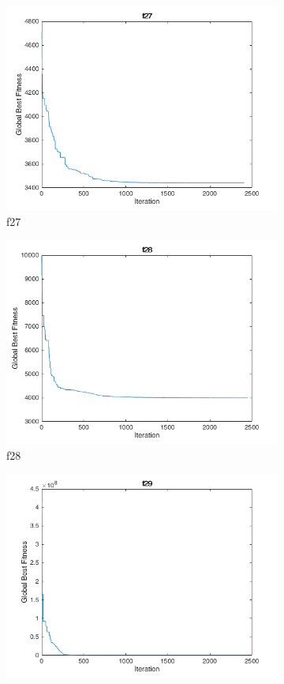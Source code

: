 \begin{figure}
\begin{subfigure}[b]{0.4\textwidth}
    \includegraphics[width=\textwidth]{img/cecrt/f27}
    \caption{f27}
  \end{subfigure}
  \begin{subfigure}[b]{0.4\textwidth}
    \includegraphics[width=\textwidth]{img/cecrt/f28}
    \caption{f28}
  \end{subfigure}
  \begin{subfigure}[b]{0.4\textwidth}
    \includegraphics[width=\textwidth]{img/cecrt/f29}

\end{subfigure}
\end{figure}
